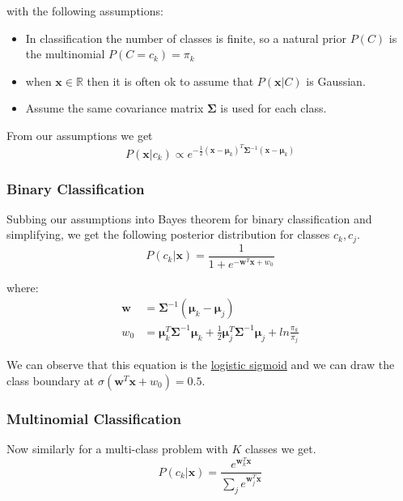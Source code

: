 \documentclass[12pt]{article}
\begin{document}
        with the following assumptions:
        \begin{itemize}
            \item In classification the number of classes is finite, so a natural prior $P(C)$ is the multinomial $P(C = c_k) = \pi_k$
            \item when $\boldsymbol{x} \in \mathbb{R}$ then it is often ok to assume that $P(\boldsymbol{x}|C)$ is Gaussian.
            \item Assume the same covariance matrix $\boldsymbol{\Sigma}$ is used for each class.
        \end{itemize}

        From our assumptions we get
        $$P(\boldsymbol{x}|c_k) \propto e^{-\frac{1}{2}(\boldsymbol{x} - \boldsymbol{\mu}_k)^T \boldsymbol{\Sigma}^{-1}(\boldsymbol{x} - \boldsymbol{\mu}_k)} $$


        \subsubsection{Binary Classification}
        Subbing our assumptions into Bayes theorem for binary classification and simplifying, we get the following posterior distribution for classes $c_k, c_j$.
        $$ P(c_k|\boldsymbol{x}) = \frac{1}{1+e^{-\boldsymbol{w}^T\boldsymbol{x} + w_0}} $$

        where:
        \begin{align*}
            \boldsymbol{w} &= \boldsymbol{\Sigma}^{-1}(\boldsymbol{\mu}_k - \boldsymbol{\mu}_j) \\
            w_0 &= \boldsymbol{\mu}^T_k \boldsymbol{\Sigma}^{-1}\boldsymbol{\mu}_k + \frac{1}{2}\boldsymbol{\mu}^T_j\boldsymbol{\Sigma}^{-1}\boldsymbol{\mu}_j + ln\frac{\pi_k}{\pi_j}
        \end{align*}

        We can observe that this equation is the \hyperlink{Sigmoid Function}{logistic sigmoid} and we can draw the class boundary at $\sigma(\boldsymbol{w}^T\boldsymbol{x} + w_0) = 0.5$.
        
        \subsubsection{Multinomial Classification}
        Now similarly for a multi-class problem with $K$ classes we get.
        $$ P(c_k | \boldsymbol{x}) = \frac{e^{\boldsymbol{w}^T_k\boldsymbol{x}}}{\sum_j e^{\boldsymbol{w}^T_j\boldsymbol{x}}} $$
\end{document}
